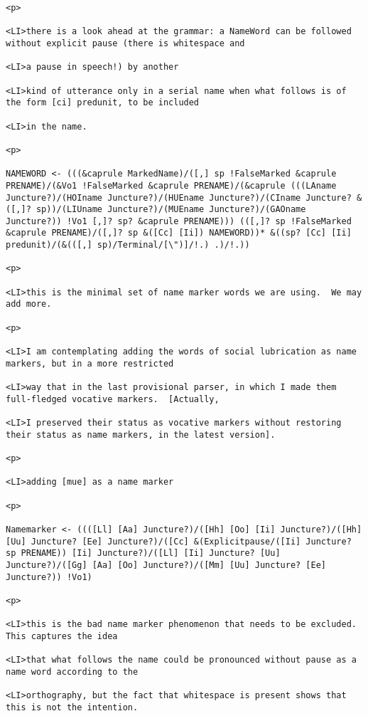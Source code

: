 \documentclass[12pt]{article}
\begin{document}
\begin{lstlisting}
<p>

<LI>there is a look ahead at the grammar: a NameWord can be followed without explicit pause (there is whitespace and

<LI>a pause in speech!) by another

<LI>kind of utterance only in a serial name when what follows is of the form [ci] predunit, to be included

<LI>in the name.

<p>

NAMEWORD <- (((&caprule MarkedName)/([,] sp !FalseMarked &caprule PRENAME)/(&Vo1 !FalseMarked &caprule PRENAME)/(&caprule (((LAname Juncture?)/(HOIname Juncture?)/(HUEname Juncture?)/(CIname Juncture? &([,]? sp))/(LIUname Juncture?)/(MUEname Juncture?)/(GAOname Juncture?)) !Vo1 [,]? sp? &caprule PRENAME))) (([,]? sp !FalseMarked &caprule PRENAME)/([,]? sp &([Cc] [Ii]) NAMEWORD))* &((sp? [Cc] [Ii] predunit)/(&(([,] sp)/Terminal/[\")]/!.) .)/!.))

<p>

<LI>this is the minimal set of name marker words we are using.  We may add more.

<p>

<LI>I am contemplating adding the words of social lubrication as name markers, but in a more restricted

<LI>way that in the last provisional parser, in which I made them full-fledged vocative markers.  [Actually,

<LI>I preserved their status as vocative markers without restoring their status as name markers, in the latest version].

<p>

<LI>adding [mue] as a name marker

<p>

Namemarker <- ((([Ll] [Aa] Juncture?)/([Hh] [Oo] [Ii] Juncture?)/([Hh] [Uu] Juncture? [Ee] Juncture?)/([Cc] &(Explicitpause/([Ii] Juncture? sp PRENAME)) [Ii] Juncture?)/([Ll] [Ii] Juncture? [Uu] Juncture?)/([Gg] [Aa] [Oo] Juncture?)/([Mm] [Uu] Juncture? [Ee] Juncture?)) !Vo1)

<p>

<LI>this is the bad name marker phenomenon that needs to be excluded.  This captures the idea

<LI>that what follows the name could be pronounced without pause as a name word according to the

<LI>orthography, but the fact that whitespace is present shows that this is not the intention.


\end{lstlisting}
\end{document}
